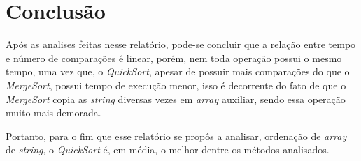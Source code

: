 \documentclass[12pt,a4paper,oneside]{article}
\begin{document}
\section{Conclusão}

\quad Após as analises feitas nesse relatório, pode-se concluir que a relação entre tempo e número de comparações é linear, porém, nem toda operação possui o mesmo tempo, uma vez que, o \textit{QuickSort}, apesar de possuir mais comparações do que o \textit{MergeSort}, possui tempo de execução menor, isso é decorrente do fato de que o \textit{MergeSort} copia as \textit{string} diversas vezes em \textit{array} auxiliar, sendo essa operação muito mais demorada.

\quad Portanto, para o fim que esse relatório se propôs a analisar, ordenação de \textit{array} de \textit{string}, o \textit{QuickSort} é, em média, o melhor dentre os métodos analisados.
\end{document}

